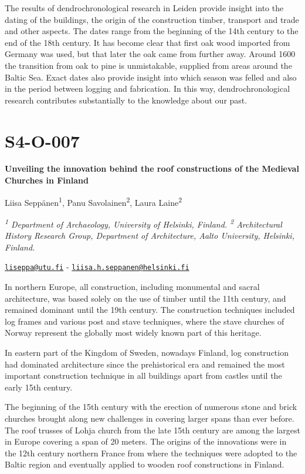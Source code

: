 \documentclass[
]{book}
\begin{document}
The results of dendrochronological research in Leiden provide insight into the dating of the buildings, the origin of the construction timber, transport and trade and other aspects. The dates range from the beginning of the 14th century to the end of the 18th century. It has become clear that first oak wood imported from Germany was used, but that later the oak came from further away. Around 1600 the transition from oak to pine is unmistakable, supplied from areas around the Baltic Sea. Exact dates also provide insight into which season was felled and also in the period between logging and fabrication. In this way, dendrochronological research contributes substantially to the knowledge about our past.

\hypertarget{s4-o-007}{%
\section*{S4-O-007}\label{s4-o-007}}

\textbf{Unveiling the innovation behind the roof constructions of the Medieval Churches in Finland}

Liisa Seppänen\textsuperscript{1}, Panu Savolainen\textsuperscript{2}, Laura Laine\textsuperscript{2}

\emph{\textsuperscript{1} Department of Archaeology, University of Helsinki, Finland. \textsuperscript{2} Architectural History Research Group, Department of Architecture, Aalto University, Helsinki, Finland.}

\href{mailto:liseppa@utu.fi}{\nolinkurl{liseppa@utu.fi}} - \href{mailto:liisa.h.seppanen@helsinki.fi}{\nolinkurl{liisa.h.seppanen@helsinki.fi}}

In northern Europe, all construction, including monumental and sacral architecture, was based solely on the use of timber until the 11th century, and remained dominant until the 19th century. The construction techniques included log frames and various post and stave techniques, where the stave churches of Norway represent the globally most widely known part of this heritage.

In eastern part of the Kingdom of Sweden, nowadays Finland, log construction had dominated architecture since the prehistorical era and remained the most important construction technique in all buildings apart from castles until the early 15th century.

The beginning of the 15th century with the erection of numerous stone and brick churches brought along new challenges in covering larger spans than ever before. The roof trusses of Lohja church from the late 15th century are among the largest in Europe covering a span of 20 meters. The origins of the innovations were in the 12th century northern France from where the techniques were adopted to the Baltic region and eventually applied to wooden roof constructions in Finland.
\end{document}
